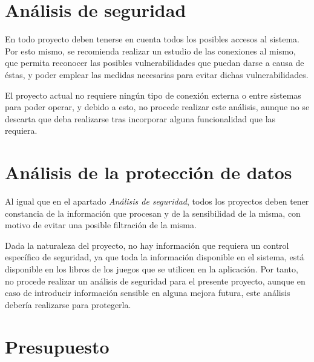 \section{Análisis de seguridad}
En todo proyecto deben tenerse en cuenta todos los posibles accesos al sistema. Por 
esto mismo, se recomienda realizar un estudio de las conexiones al mismo, que permita reconocer las 
posibles vulnerabilidades que puedan darse a causa de éstas, y poder emplear las medidas necesarias 
para evitar dichas vulnerabilidades. \medskip

El proyecto actual no requiere ningún tipo de conexión externa o entre sistemas para poder operar, y 
debido a esto, no procede realizar este análisis, aunque no se descarta que deba realizarse tras 
incorporar alguna funcionalidad que las requiera.

\section{Análisis de la protección de datos}
Al igual que en el apartado \textit{Análisis de seguridad}, todos los proyectos deben tener constancia 
de la información que procesan y de la sensibilidad de la misma, con motivo de evitar una posible filtración 
de la misma. \medskip

Dada la naturaleza del proyecto, no hay información que requiera un control específico 
de seguridad, ya que toda la información disponible en el sistema, está disponible en los libros de los
juegos que se utilicen en la aplicación. Por tanto, no procede realizar un análisis de seguridad para 
el presente proyecto, aunque en caso de introducir información sensible en alguna mejora futura, este 
análisis debería realizarse para protegerla.

\section{Presupuesto}







